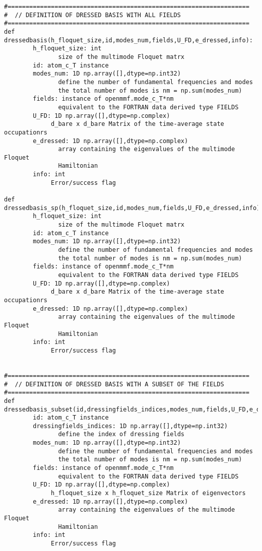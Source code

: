 \documentclass[10pt,a4paper]{article}
\begin{document}
\begin{verbatim}
#===================================================================
#  // DEFINITION OF DRESSED BASIS WITH ALL FIELDS
#===================================================================
def dressedbasis(h_floquet_size,id,modes_num,fields,U_FD,e_dressed,info):
        h_floquet_size: int
               size of the multimode Floquet matrx
        id: atom_c_T instance
        modes_num: 1D np.array([],dtype=np.int32)
               define the number of fundamental frequencies and modes
               the total number of modes is nm = np.sum(modes_num)
        fields: instance of openmmf.mode_c_T*nm 
               equivalent to the FORTRAN data derived type FIELDS
        U_FD: 1D np.array([],dtype=np.complex)
             d_bare x d_bare Matrix of the time-average state occupationrs                          
        e_dressed: 1D np.array([],dtype=np.complex)
               array containing the eigenvalues of the multimode Floquet
               Hamiltonian
        info: int
             Error/success flag

def dressedbasis_sp(h_floquet_size,id,modes_num,fields,U_FD,e_dressed,info):
        h_floquet_size: int
               size of the multimode Floquet matrx
        id: atom_c_T instance
        modes_num: 1D np.array([],dtype=np.int32)
               define the number of fundamental frequencies and modes
               the total number of modes is nm = np.sum(modes_num)
        fields: instance of openmmf.mode_c_T*nm 
               equivalent to the FORTRAN data derived type FIELDS
        U_FD: 1D np.array([],dtype=np.complex)
             d_bare x d_bare Matrix of the time-average state occupationrs                          
        e_dressed: 1D np.array([],dtype=np.complex)
               array containing the eigenvalues of the multimode Floquet
               Hamiltonian
        info: int
             Error/success flag


#===================================================================
#  // DEFINITION OF DRESSED BASIS WITH A SUBSET OF THE FIELDS
#===================================================================
def dressedbasis_subset(id,dressingfields_indices,modes_num,fields,U_FD,e_dressed,info):
        id: atom_c_T instance
        dressingfields_indices: 1D np.array([],dtype=np.int32)
               define the index of dressing fields
        modes_num: 1D np.array([],dtype=np.int32)
               define the number of fundamental frequencies and modes
               the total number of modes is nm = np.sum(modes_num)
        fields: instance of openmmf.mode_c_T*nm 
               equivalent to the FORTRAN data derived type FIELDS
        U_FD: 1D np.array([],dtype=np.complex)
             h_floquet_size x h_floquet_size Matrix of eigenvectors            
        e_dressed: 1D np.array([],dtype=np.complex)
               array containing the eigenvalues of the multimode Floquet
               Hamiltonian
        info: int
             Error/success flag



\end{verbatim}
\end{document}
